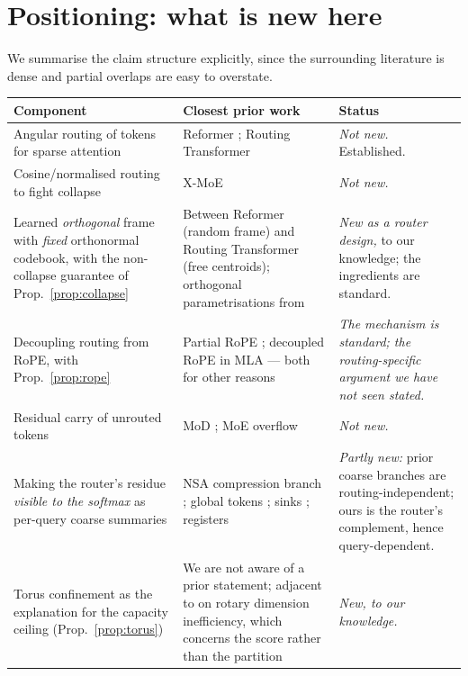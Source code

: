 \section{Positioning: what is new here}
\label{sec:positioning}

We summarise the claim structure explicitly, since the surrounding literature is dense and partial overlaps are easy to overstate.

\begin{table}[h]
\centering
\small
\begin{tabular}{p{4.3cm}p{5.1cm}p{4.4cm}}
\toprule
\textbf{Component} & \textbf{Closest prior work} & \textbf{Status} \\
\midrule
Angular routing of tokens for sparse attention & Reformer \citep{kitaev2020reformer}; Routing Transformer \citep{roy2021routing} & \emph{Not new.} Established. \\
Cosine/normalised routing to fight collapse & X-MoE \citep{chi2022representation} & \emph{Not new.} \\
Learned \emph{orthogonal} frame with \emph{fixed} orthonormal codebook, with the non-collapse guarantee of Prop.~\ref{prop:collapse} & Between Reformer (random frame) and Routing Transformer (free centroids); orthogonal parametrisations from \citep{mhammedi2017householder,lezcano2019trivializations} & \emph{New as a router design,} to our knowledge; the ingredients are standard. \\
Decoupling routing from RoPE, with Prop.~\ref{prop:rope} & Partial RoPE \citep{black2022gptneox}; decoupled RoPE in MLA \citep{deepseekv2} --- both for other reasons & \emph{The mechanism is standard; the routing-specific argument we have not seen stated.} \\
Residual carry of unrouted tokens & MoD \citep{raposo2024mixture}; MoE overflow \citep{fedus2022switch} & \emph{Not new.} \\
Making the router's residue \emph{visible to the softmax} as per-query coarse summaries & NSA compression branch \citep{yuan2025nsa}; global tokens \citep{beltagy2020longformer,zaheer2020bigbird}; sinks \citep{xiao2024streaming}; registers \citep{darcet2024registers} & \emph{Partly new:} prior coarse branches are routing-independent; ours is the router's complement, hence query-dependent. \\
\midrule
Torus confinement as the explanation for the capacity ceiling (Prop.~\ref{prop:torus}) & We are not aware of a prior statement; adjacent to \citet{chiang2025ropedim} on rotary dimension inefficiency, which concerns the score rather than the partition & \emph{New, to our knowledge.} \\

\end{tabular}
\end{table}
